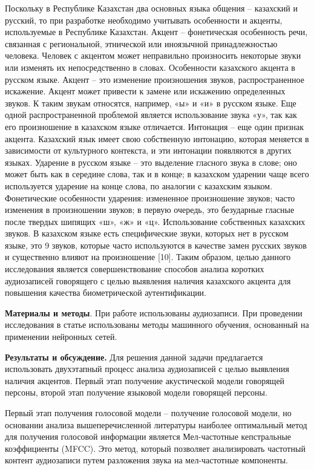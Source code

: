 \begin{multicols}{2}
Поскольку в Республике Казахстан два основных языка общения -- казахский
и русский, то при разработке необходимо учитывать особенности и акценты,
используемые в Республике Казахстан. Акцент -- фонетическая особенность
речи, связанная с региональной, этнической или иноязычной
принадлежностью человека. Человек с акцентом может неправильно
произносить некоторые звуки или изменять их непосредственно в словах.
Особенности казахского акцента в русском языке. Акцент -- это изменение
произношения звуков, распространенное искажение. Акцент может привести к
замене или искажению определенных звуков. К таким звукам относятся,
например, «ы» и «и» в русском языке. Еще одной распространенной
проблемой является использование звука «у», так как его произношение в
казахском языке отличается. Интонация -- еще один признак акцента.
Казахский язык имеет свою собственную интонацию, которая меняется в
зависимости от культурного контекста, и эти интонации появляются в
других языках. Ударение в русском языке -- это выделение гласного звука
в слове; оно может быть как в середине слова, так и в конце; в казахском
ударении чаще всего используется ударение на конце слова, по аналогии с
казахским языком. Фонетические особенности ударения: измененное
произношение звуков; часто изменения в произношении звуков; в первую
очередь, это безударные гласные после твердых шипящих «ш», «ж» и «ц».
Использование собственных казахских звуков. В казахском языке есть
специфические звуки, которых нет в русском языке, это 9 звуков, которые
часто используются в качестве замен русских звуков и существенно влияют
на произношение {[}10{]}. Таким образом, целью данного исследования
является совершенствование способов анализа коротких аудиозаписей
говорящего с целью выявления наличия казахского акцента для повышения
качества биометрической аутентификации.

{\bfseries Материалы и методы}. При работе использованы аудиозаписи. При
проведении исследования в статье использованы методы машинного обучения,
основанный на применении нейронных сетей.

{\bfseries Результаты и обсуждение.} Для решения данной задачи предлагается
использовать двухэтапный процесс анализа аудиозаписей с целью выявления
наличия акцентов. Первый этап получение акустической модели говорящей
персоны, второй этап получение языковой модели говорящей персоны.

Первый этап получения голосовой модели -- получение голосовой модели, но
основании анализа вышеперечисленной литературы наиболее оптимальный
метод для получения голосовой информации является Мел-частотные
кепстральные коэффициенты (MFCC). Это метод, который позволяет
анализировать частотный контент аудиозаписи путем разложения звука на
мел-частотные компоненты.


\end{multicols}
